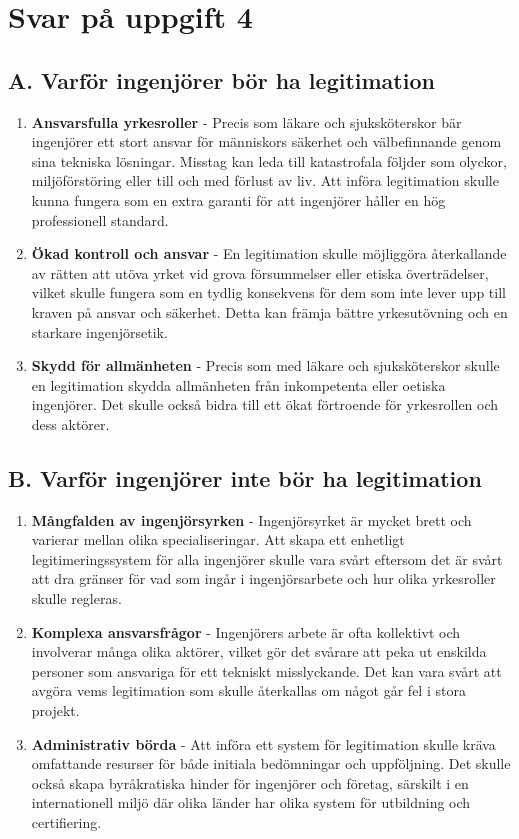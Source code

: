 \documentclass[a4paper,12pt]{article}
\begin{document}
\section*{Svar på uppgift 4}
%
\subsection*{A. Varför ingenjörer bör ha legitimation}
\begin{enumerate}
    \item \textbf{Ansvarsfulla yrkesroller} - Precis som läkare och
          sjuksköterskor bär ingenjörer ett stort ansvar för människors säkerhet och
          välbefinnande genom sina tekniska lösningar. Misstag kan leda till
          katastrofala följder som olyckor, miljöförstöring eller till och med
          förlust av liv. Att införa legitimation skulle kunna fungera som en extra
          garanti för att ingenjörer håller en hög professionell standard.
    \item \textbf{Ökad kontroll och ansvar} - En legitimation skulle möjliggöra
          återkallande av rätten att utöva yrket vid grova försummelser eller etiska
          överträdelser, vilket skulle fungera som en tydlig konsekvens för dem som
          inte lever upp till kraven på ansvar och säkerhet. Detta kan främja bättre
          yrkesutövning och en starkare ingenjörsetik.
    \item \textbf{Skydd för allmänheten} - Precis som med läkare och
          sjuksköterskor skulle en legitimation skydda allmänheten från inkompetenta
          eller oetiska ingenjörer. Det skulle också bidra till ett ökat förtroende
          för yrkesrollen och dess aktörer.
\end{enumerate}
%
\subsection*{B. Varför ingenjörer inte bör ha legitimation}
\begin{enumerate}
    \item \textbf{Mångfalden av ingenjörsyrken} - Ingenjörsyrket är mycket
          brett och varierar mellan olika specialiseringar. Att skapa ett enhetligt
          legitimeringssystem för alla ingenjörer skulle vara svårt eftersom det är
          svårt att dra gränser för vad som ingår i ingenjörsarbete och hur olika
          yrkesroller skulle regleras.
    \item \textbf{Komplexa ansvarsfrågor} - Ingenjörers arbete är ofta
          kollektivt och involverar många olika aktörer, vilket gör det svårare att
          peka ut enskilda personer som ansvariga för ett tekniskt misslyckande. Det
          kan vara svårt att avgöra vems legitimation som skulle återkallas om något
          går fel i stora projekt.
    \item \textbf{Administrativ börda} - Att införa ett system för legitimation
          skulle kräva omfattande resurser för både initiala bedömningar och
          uppföljning. Det skulle också skapa byråkratiska hinder för ingenjörer och
          företag, särskilt i en internationell miljö där olika länder har olika
          system för utbildning och certifiering.
\end{enumerate}
%
\end{document}
